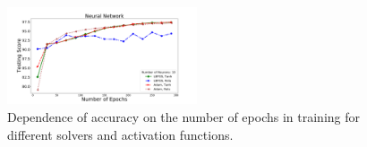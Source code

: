 \begin{figure}[h]
\hspace*{-0.5cm}
\includegraphics[width=0.5\textwidth]{plots/nn_epochs.pdf}
\caption{
Dependence of accuracy on the number of epochs in training for different solvers and activation functions.
}
\label{fig:NN_epochs}
\end{figure}

